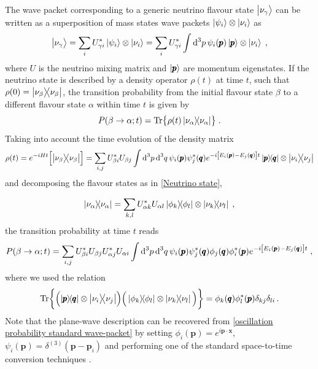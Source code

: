 \documentclass[11pt]{article}
\newcommand{\intt}[1]{\int\dd[3]{#1}}
\begin{document}
The wave packet corresponding to a generic neutrino flavour state $\ket{\nu_\gamma}$ can be written as a superposition of  mass states wave packets  $\ket{\psi_i} \otimes \ket{\nu_i}$ as 
\begin{equation}
    \ket{\nu_\gamma} = \sum_i U^*_{\gamma i} \ket{\psi_i}\otimes\ket{\nu_i} = \sum_i U^*_{\gamma i} \intt{p}\psi_i\qty(\pmb{p})\ket{\pmb{p}}\otimes\ket{\nu_i}\;,\label{Neutrino state}
\end{equation}
where $U$ is the neutrino mixing matrix and $\ket{\pmb{p}}$ are momentum eigenstates. If the neutrino state is described by a density operator $\rho(t)$ at time $t$, such that $\rho(0) = \ketbra{\nu_\beta}{\nu_\beta}$, the transition probability from the initial flavour state $\beta$ to a different flavour state $\alpha$ within time $t$ is given by 
\begin{equation}
    P(\beta\to\alpha;t) = \Tr{\rho(t)\ketbra{\nu_\alpha}{\nu_\alpha}}\;.
\end{equation}
Taking into account the time evolution of the density matrix
\begin{equation}
    \rho(t) = e^{-iHt} \qty[\ketbra{\nu_\beta}{\nu_\beta}] =
    \sum_{i,j} U_{\beta i}^* U_{\beta j} \int \text{d}^3p \,\text{d}^3 q\,\psi_i\qty(\pmb{p})\psi_j^*\qty(\pmb{q}) e^{-i\qty[E_i\qty(\pmb{p})-E_j\qty(\pmb{q})]t}\ketbra{\pmb{p}}{\pmb{q}}\otimes \ketbra{\nu_i}{\nu_j}\label{time evolution standard}
\end{equation}
and decomposing the flavour states as in \eqref{Neutrino state},

\begin{equation}
    \ketbra{\nu_\alpha}{\nu_\alpha} = \sum_{k,l} U_{\alpha k}^*U_{\alpha l} \ketbra{\phi_k}{\phi_l}\otimes \ketbra{\nu_k}{\nu_l}\;,
\end{equation}
the transition probability at time $t$ reads
\begin{equation}\label{oscillation probability standard wave-packet}
     P(\beta\to\alpha;t) = \sum_{i,j} U^*_{\beta i} U_{\beta j} U^*_{\alpha j} U_{\alpha i} \int \text{d}^3p \,\text{d}^3 q\,\psi_i\qty(\pmb{p})\psi_j^*\qty(\pmb{q})\phi_j\qty(\pmb{q})\phi_i^*\qty(\pmb{p})e^{-i\qty[E_i\qty(\pmb{p})-E_j\qty(\pmb{q})]t}\;,
\end{equation}
where we used the relation
\begin{equation}
    \Tr{\qty(\ketbra{\pmb{p}}{\pmb{q}}\otimes \ketbra{\nu_i}{\nu_j})\Big(\ketbra{\phi_k}{\phi_l}\otimes \ketbra{\nu_k}{\nu_l}\Big)} = \phi_k\qty(\pmb{q})\phi_l^*\qty(\pmb{p})\delta_{kj}\delta_{li}\,.
\end{equation}
Note  that the  plane-wave description can be recovered from \eqref{oscillation probability standard wave-packet} by setting $\phi_i(\pmb{p}) = e^{i\pmb{p}\cdot\pmb{x}}$, $\psi_i(\pmb{p}) = \delta^{(3)}(\pmb{p}-\pmb{p}_i)$ and performing one of the standard space-to-time conversion techniques \cite{Akhmedov:2009rb}. 
\end{document}
